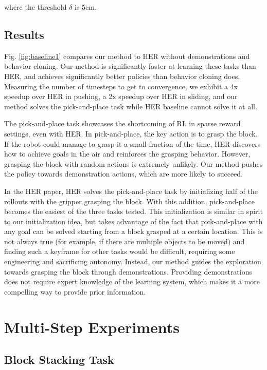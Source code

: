 \documentclass[letterpaper, 10 pt, conference]{ieeeconf}  %
\begin{document}
\noindent where the threshold $\delta$ is 5cm.

\subsection{Results}

Fig. \ref{fig:baseline1} compares our method to HER without demonstrations and behavior cloning. Our method is significantly faster at learning these tasks than HER, and achieves significantly better policies than behavior cloning does. Measuring the number of timesteps to get to convergence, we exhibit a 4x speedup over HER in pushing, a 2x speedup over HER in sliding, and our method solves the pick-and-place task while HER baseline cannot solve it at all.

The pick-and-place task showcases the shortcoming of RL in sparse reward settings, even with HER. In pick-and-place, the key action is to grasp the block. If the robot could manage to grasp it a small fraction of the time, HER discovers how to achieve goals in the air and reinforces the grasping behavior. However, grasping the block with random actions is extremely unlikely. Our method pushes the policy towards demonstration actions, which are more likely to succeed.

In the HER paper, HER solves the pick-and-place task by initializing half of the rollouts with the gripper grasping the block. With this addition, pick-and-place becomes the easiest of the three tasks tested. This initialization is similar in spirit to our initialization idea, but takes advantage of the fact that pick-and-place with any goal can be solved starting from a block grasped at a certain location. This is not always true (for example, if there are multiple objects to be moved) and finding such a keyframe for other tasks would be difficult, requiring some engineering and sacrificing autonomy. Instead, our method guides the exploration towards grasping the block through demonstrations. Providing demonstrations does not require expert knowledge of the learning system, which makes it a more compelling way to provide prior information.

\section{Multi-Step Experiments} \label{sec:multistep}

\subsection{Block Stacking Task}
\end{document}
